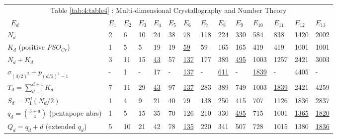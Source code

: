 \documentclass[a4paper,9pt]{article}
\newcounter{col}
\begin{document}
\begin{table}
  \hskip-0.0cm\begin{tabular}{llllllllllllll}
    \toprule
    \multicolumn{14}{c}{Table \ref{tab:4:table4} : Multi-dimensional Crystallography and Number Theory}                  \\
    \cmidrule(r){1-14}
      
      \ $E_d$  & $E_1 $ & $E_2$ & $E_3 $& $E_4$ &$ E_5$ &$ E_6 $&$ E_7$ &$ E_8$ & $E_9$ &$ E_{10} $&$ E_{11} $&$ E_{12}$&$ E_{13}$ \\
    \midrule
    
    $N_d$ & 2 & 6 & 10 & 24 & 38 & \underline{78} & 118 & 224 & 330 & 584 & 838 & 1420 & 2002  \\
       
    $K_d$ (positive $PSO_{Cr}$)  & 1 & 5 & 5 & 19 & 19 & \underline{59} & 59 & 165 & 165& 419 & 419 & 1001 & 1001 \\
    
    
    
    
    
     $N_d + K_d$  & 3 & 11 & 15 & \underline{43} & 57 & \underline{137} & 177 & 389 & \underline{495} &  1003 & 1257 & 2421 & 3003 \\
    
    
    
    $\sigma_{(d/2)^2} +  p_{(d/2)^2-1}$  & - & 1 & -& 17 & - & \underline{137} & - & \underline{611} & - &  \underline{1839} &   - & 4405 & -\\
    
    $T_d =\sum_{d-1}^{d+1}K_d$   & 7 & 11 & 29 & \underline{43} & 97 & \underline{137} & 283 & 389 & 749 & 1003 & \underline{1839} & 2421 & 4259 \\
    
    $S_d=\Sigma_1^d (N_d/2)$   & 1 & 4 & 9 & 21 & 40 & 79 & \underline{138} & 250 & 415 & 707 & 1126 & \underline{1836} & 2837 \\
    
    
     $q_d=\binom{3+d}{4}$ (pentapope nbrs)  & 1 & 5 & 15 & 35 & 70 & 126 & 210 & 330 & \underline {495} & 715 & 1001 &\underline{1365}& \underline{1820}\\
     
     
     
     
     $Q_d=q_d + d$  (extended $q_d$)   & 5 & 10 & 21 & 42 & 78 & \underline{135} & 220 & 341 & 507 & 728 & 1015 & 1380 & \underline{1836}\\
    

\end{tabular}
\end{table}
\end{document}
